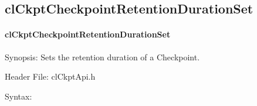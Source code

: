 \begin{flushleft}
\subsection{clCkptCheckpointRetentionDurationSet}
\hypertarget{pageckpt107}{}\paragraph{cl\-Ckpt\-Checkpoint\-Retention\-Duration\-Set}\label{pageckpt107}
\begin{Desc}
\item[Synopsis:]Sets the retention duration of a Checkpoint.\end{Desc}
\begin{Desc}
\item[Header File:]clCkptApi.h\end{Desc}
\begin{Desc}
\item[Syntax:]


\end{Desc}
\end{flushleft}
